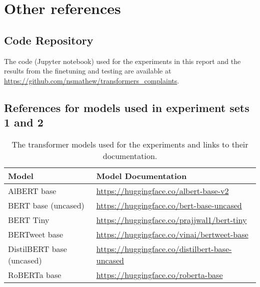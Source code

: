 
\chapter{Other references}

\section{Code Repository}
The code (Jupyter notebook) used for the experiments in this report and the results from the finetuning and testing are available at \url{https://github.com/nsmathew/transformers_complaints}.

\section{References for models used in experiment sets 1 and 2}

\begin{table}[ht]
    \captionsetup{font=small}
    \centering
    \begin{tabularx}{\textwidth}{|l|X|}
        \hline
        \rowcolor[gray]{0.7}
        \textbf{Model}            & \textbf{Model Documentation}                                   \\
        \hline

        AlBERT base               & \small{\url{https://huggingface.co/albert-base-v2}}            \\
        \hline
        BERT base (uncased)       & \small{\url{https://huggingface.co/bert-base-uncased}}         \\
        \hline
        BERT Tiny                 & \small{\url{https://huggingface.co/prajjwal1/bert-tiny}}       \\
        \hline
        BERTweet base             & \small{\url{https://huggingface.co/vinai/bertweet-base}}       \\
        \hline
        DistilBERT base (uncased) & \small{\url{https://huggingface.co/distilbert-base-uncased}}   \\
        \hline
        RoBERTa base              & \small{\url{https://huggingface.co/roberta-base}}              \\
        \hline
    \end{tabularx}
    \caption{The transformer models used for the experiments and links to their documentation.}
    \label{tab: apdxb_model_doc}
\end{table}


